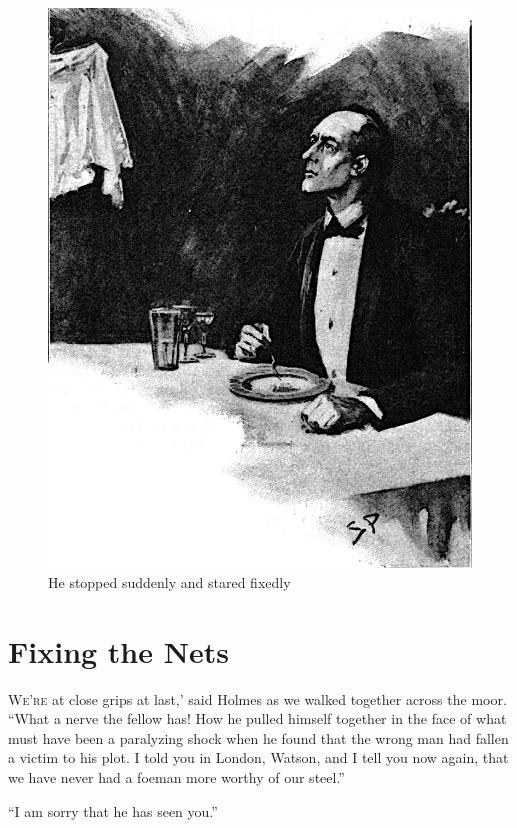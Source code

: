 \documentclass[paper=a5,BCOR=7mm,twoside,DIV=calc,12pt,usegeometry,openany,chapterprefix,endperiod,headings=big]{scrbook} %
\begin{document}
\clearpage
\vfill
\begin{figure}[tbph]
\centering
\includegraphics[width=\linewidth]{13_stopstare}
\caption{He stopped suddenly and stared fixedly}
\end{figure}
\vfill
\thispagestyle{empty}
\clearpage

\chapter{Fixing the Nets}

\lettrine[ante=`,lines=1]{W}{e're} at close grips at last,' said Holmes as we walked together across the moor. \enquote{What a nerve the fellow has! How he pulled himself together in the face of what must have been a paralyzing shock when he found that the wrong man had fallen a victim to his plot. I told you in London, Watson, and I tell you now again, that we have never had a foeman more worthy of our steel.}

\enquote{I am sorry that he has seen you.}
\end{document}
